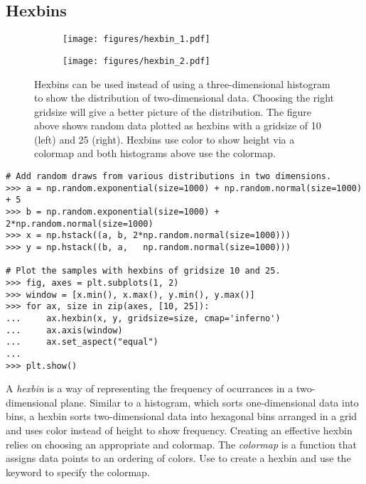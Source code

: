 \subsection*{Hexbins} %

\begin{figure}[H] %
    \centering
    \begin{subfigure}{.47\textwidth}
        \centering
        \texttt{[image: figures/hexbin\_1.pdf]}
    \end{subfigure}
    \begin{subfigure}{.47\textwidth}
        \centering
        \texttt{[image: figures/hexbin\_2.pdf]}
    \end{subfigure}
    \caption{Hexbins can be used instead of using a three-dimensional histogram to show the distribution of two-dimensional data. Choosing the right gridsize will give a better picture of the distribution. The figure above shows random data plotted as hexbins with a gridsize of 10 (left) and 25 (right). Hexbins use color to show height via a colormap and both histograms above use the  colormap.}
    \label{fig:scatter_hexbin}
\end{figure}

\begin{lstlisting}
# Add random draws from various distributions in two dimensions.
>>> a = np.random.exponential(size=1000) + np.random.normal(size=1000) + 5
>>> b = np.random.exponential(size=1000) + 2*np.random.normal(size=1000)
>>> x = np.hstack((a, b, 2*np.random.normal(size=1000)))
>>> y = np.hstack((b, a,   np.random.normal(size=1000)))

# Plot the samples with hexbins of gridsize 10 and 25.
>>> fig, axes = plt.subplots(1, 2)
>>> window = [x.min(), x.max(), y.min(), y.max()]
>>> for ax, size in zip(axes, [10, 25]):
...     ax.hexbin(x, y, gridsize=size, cmap='inferno')
...     ax.axis(window)
...     ax.set_aspect("equal")
...
>>> plt.show()
\end{lstlisting}

A \emph{hexbin} is a way of representing the frequency of ocurrances in a two-dimensional plane.
Similar to a histogram, which sorts one-dimensional data into bins, a hexbin sorts two-dimensional data into hexagonal bins arranged in a grid and uses color instead of height to show frequency.
Creating an effective hexbin relies on choosing an appropriate  and colormap.
The \emph{colormap} is a function that assigns data points to an ordering of colors.
Use  to create a hexbin and use the  keyword to specify the colormap.

